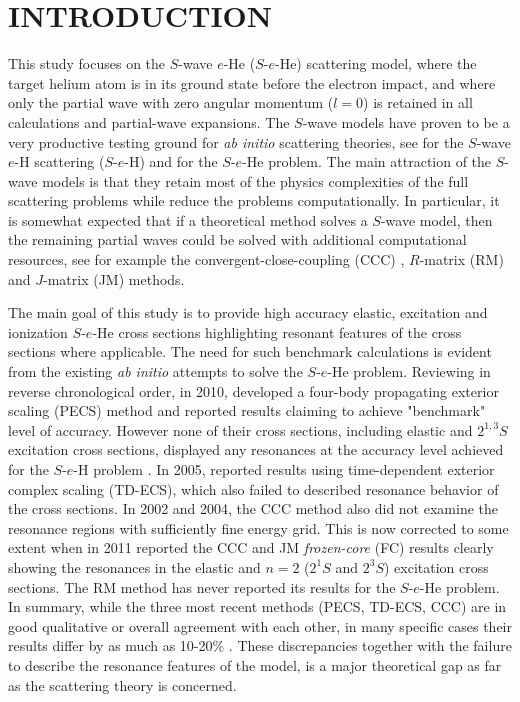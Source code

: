 \documentclass[aip
, pra
, showpacs
, aps
, twocolumn
, groupedaddress
, floatfix
]{revtex4}
\begin{document}
\section{INTRODUCTION}


This study focuses on the $S$-wave $e$-He ($S$-$e$-He) scattering model,
where the target helium atom is in its ground state before the electron impact,
and where only the partial wave with zero angular momentum ($l=0$) is retained in all calculations
and partial-wave expansions.
The $S$-wave models have proven to be a very productive testing ground for {\it ab initio} scattering theories,
see \cite{T62,HY74p1209,P78,P80,P81,CO84,BS92p53,BST93,KM94pL407,IDHF95,PS96,JS02,JS00l,BRIM99,S99l,MHR02,BS04,Frapiccini10} for the $S$-wave $e$-H scattering ($S$-$e$-H)
and \cite{DHIF94,PMR99,PBFS02,PNBFS04,HMR05R,HMR05,BS10p022715,BS10p022716,KFB11} for  the $S$-$e$-He problem.
The main attraction of the $S$-wave models is that they retain most of the physics complexities of the full
scattering problems while reduce the problems computationally.
In particular, it is somewhat expected that if a theoretical method solves a $S$-wave model, then
the remaining partial waves could be solved with additional computational resources,
see for example the convergent-close-coupling (CCC) \cite{FB95},
$R$-matrix (RM) \cite{FLRS94b, PhysRevA.54.R998, SMC2006}
and $J$-matrix (JM) \cite{KM94pL741,KM95pL139} methods.


The main goal of this study is to provide high accuracy elastic, excitation and ionization $S$-$e$-He cross sections highlighting resonant features of the cross sections where applicable.
The need for such benchmark calculations is evident from the existing {\em ab initio} attempts to solve the $S$-$e$-He problem.
Reviewing in reverse chronological order, in 2010, \citet{BS10p022715} developed a four-body propagating exterior scaling (PECS) method and reported results claiming to achieve "benchmark" level of accuracy.
However none of their cross sections, including elastic and $2^{1,3}S$ excitation cross sections, displayed any resonances at the accuracy level achieved for the $S$-$e$-H problem \cite{P78}.
In 2005, \citet{HMR05} reported results using
time-dependent exterior complex scaling (TD-ECS), which also failed to described resonance behavior of the cross sections.
In 2002 and 2004, the CCC method \cite{PBFS02,PNBFS04} also did not examine the resonance regions with sufficiently fine energy grid.
This is now corrected to some extent when in 2011 \citet{KFB11} reported the CCC and JM {\em frozen-core}
(FC) results clearly showing the resonances in the elastic and $n=2$ ($2^1S$ and $2^3S$) excitation cross sections.
The RM method \cite{FLRS94b, SMC2006} has never reported its results for the $S$-$e$-He problem.
In summary, while the three most recent methods (PECS, TD-ECS, CCC) are in good qualitative or overall agreement with each other, 
in many specific cases their results differ by as much as 10-20\% \cite{BS10p022715,HMR05}. 
These discrepancies together with the failure to describe the resonance features of the model,
is a major theoretical gap as far as the scattering theory is concerned. 
\end{document}
